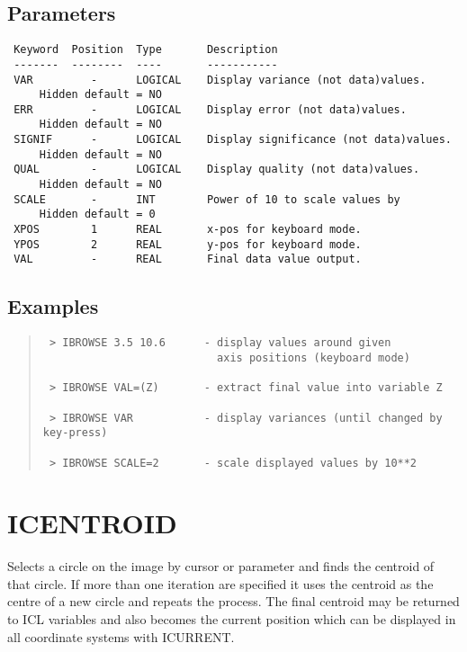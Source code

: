 \documentclass{book}
\renewcommand{\_}{{\tt\char'137}}     %
\begin{document}
\subsection{Parameters}
\begin{verbatim}
 Keyword  Position  Type       Description
 -------  --------  ----       -----------
 VAR         -      LOGICAL    Display variance (not data)values.
     Hidden default = NO
 ERR         -      LOGICAL    Display error (not data)values.
     Hidden default = NO
 SIGNIF      -      LOGICAL    Display significance (not data)values.
     Hidden default = NO
 QUAL        -      LOGICAL    Display quality (not data)values.
     Hidden default = NO
 SCALE       -      INT        Power of 10 to scale values by
     Hidden default = 0
 XPOS        1      REAL       x-pos for keyboard mode.
 YPOS        2      REAL       y-pos for keyboard mode.
 VAL         -      REAL       Final data value output.

\end{verbatim}\subsection{Examples}
\begin{quote}\begin{verbatim}
 > IBROWSE 3.5 10.6      - display values around given
                           axis positions (keyboard mode)

 > IBROWSE VAL=(Z)       - extract final value into variable Z

 > IBROWSE VAR           - display variances (until changed by key-press)

 > IBROWSE SCALE=2       - scale displayed values by 10**2
\end{verbatim}\end{quote}
\section{ICENTROID}
Selects a circle on the image by cursor or parameter and finds
the centroid of that circle. If more than one iteration are
specified it uses the centroid as the centre of a new circle
and repeats the process. The final centroid may be returned
to ICL variables and also becomes the current position which
can be displayed in all coordinate systems with ICURRENT.
\end{document}
